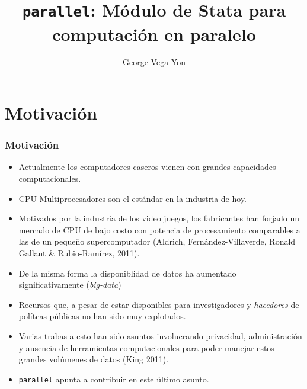\documentclass{beamer}
\title[{\tt parallel}]{{\tt parallel}: M\'odulo de Stata para computaci\'on en paralelo}
\author[GVY]{George Vega Yon}
\institute[SPensiones \and UAI]{Superintendencia de Pensiones \and Universidad Adolfo Ib\'a\~nez}
\begin{document}
\frame{\maketitle}


\section{Motivaci\'on}

\begin{frame}[allowframebreaks=.8]
\frametitle{Motivaci\'on}
\begin{itemize}
\item Actualmente los computadores caseros vienen con grandes capacidades computacionales.
\item CPU Multiprocesadores son el est\'andar en la industria de hoy.
\item Motivados por la industria de los video juegos, los fabricantes han forjado un mercado de CPU de bajo costo con potencia de procesamiento comparables a las de un peque\~no supercomputador (Aldrich, Fern\'andez-Villaverde, Ronald Gallant \& Rubio-Ram\'irez, 2011).
\item De la misma forma la disponiblidad de datos ha aumentado significativamente ({\it big-data})
\item Recursos que, a pesar de estar disponibles para investigadores y {\it hacedores} de pol\'itcas p\'ublicas no han sido muy explotados.
\item Varias trabas a esto han sido asuntos involucrando privacidad, administraci\'on y ausencia de herramientas computacionales para poder manejar estos grandes vol\'umenes de datos (King 2011).
\item {\tt parallel} apunta a contribuir en este \'ultimo asunto.
\end{itemize}
\end{frame}
\end{document}
